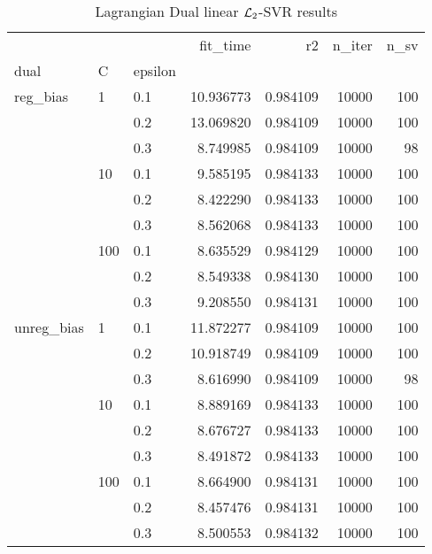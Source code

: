 \begin{table}[H]
\centering
\caption{Lagrangian Dual linear $\protect \mathcal{L}_2$-SVR results}
\label{linear_lagrangian_dual_l2_svr_cv_results}
\begin{tabular}{lllrrrr}
\toprule
           &     &     &   fit\_time &        r2 &  n\_iter &  n\_sv \\
dual & C & epsilon &            &           &         &       \\
\midrule
reg\_bias & 1   & 0.1 &  10.936773 &  0.984109 &   10000 &   100 \\
           &     & 0.2 &  13.069820 &  0.984109 &   10000 &   100 \\
           &     & 0.3 &   8.749985 &  0.984109 &   10000 &    98 \\
           & 10  & 0.1 &   9.585195 &  0.984133 &   10000 &   100 \\
           &     & 0.2 &   8.422290 &  0.984133 &   10000 &   100 \\
           &     & 0.3 &   8.562068 &  0.984133 &   10000 &   100 \\
           & 100 & 0.1 &   8.635529 &  0.984129 &   10000 &   100 \\
           &     & 0.2 &   8.549338 &  0.984130 &   10000 &   100 \\
           &     & 0.3 &   9.208550 &  0.984131 &   10000 &   100 \\
unreg\_bias & 1   & 0.1 &  11.872277 &  0.984109 &   10000 &   100 \\
           &     & 0.2 &  10.918749 &  0.984109 &   10000 &   100 \\
           &     & 0.3 &   8.616990 &  0.984109 &   10000 &    98 \\
           & 10  & 0.1 &   8.889169 &  0.984133 &   10000 &   100 \\
           &     & 0.2 &   8.676727 &  0.984133 &   10000 &   100 \\
           &     & 0.3 &   8.491872 &  0.984133 &   10000 &   100 \\
           & 100 & 0.1 &   8.664900 &  0.984131 &   10000 &   100 \\
           &     & 0.2 &   8.457476 &  0.984131 &   10000 &   100 \\
           &     & 0.3 &   8.500553 &  0.984132 &   10000 &   100 \\
\bottomrule
\end{tabular}
\end{table}
